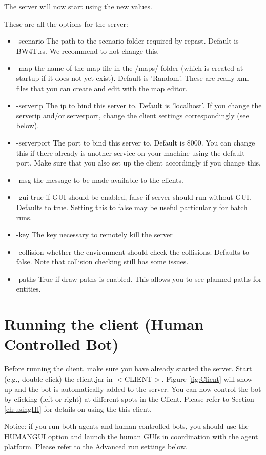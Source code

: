 \documentclass[11pt,a4paper]{article}
\begin{document}
The server will now start using the new values.

These are all the  options for the server:
\begin{itemize}
\item -scenario The path to the scenario folder required by repast. Default is BW4T.rs. We recommend to not change this.  
\item -map the name of the map file in the /maps/ folder (which is created at startup if it does not yet exist). Default is 'Random'. These are really xml files that you can create and edit with the map editor.
\item -serverip The ip to bind this server to. Default is 'localhost'. If you change the serverip and/or serverport, change the client settings correspondingly (see below). 
\item -serverport  The port to bind this server to. Default is 8000. You can change this if there already is another service on your machine using the default port. Make sure that you also set up the client accordingly if you change this.
\item -msg the message to be made available to the clients.
\item -gui true if GUI should be enabled, false if server should run without GUI. Defaults to true. Setting this to false  may be useful particularly for batch runs.
\item -key The key necessary to remotely kill the server
\item -collision whether the environment should check the collisions. Defaults to false. Note that collision checking still has some issues.
\item -paths True if draw paths is enabled. This allows you to see planned paths for entities.
\end{itemize}

\section{Running the client (Human Controlled Bot)}
Before running the client, make sure you have already started the server. Start (e.g., double click) the client.jar in $<$CLIENT$>$. Figure \ref{fig:Client} will show up and the bot is automatically added to the server. You can now control the bot by clicking (left or right) at different spots in the Client. Please refer to Section  \ref{ch:usingHI} for details on using the this client.

Notice: if you run both agents and human controlled bots, you should use the HUMANGUI option and launch the human GUIs in coordination with the agent platform. Please refer to the Advanced run settings below.
\end{document}
